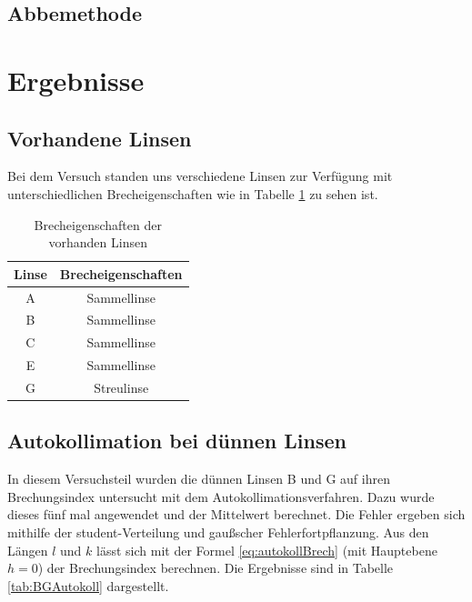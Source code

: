 \documentclass[11pt, a4paper]{article}
\begin{document}
    \subsection{Abbemethode}

    \section{Ergebnisse}
    \subsection{Vorhandene Linsen}
    Bei dem Versuch standen uns verschiedene Linsen zur Verfügung mit unterschiedlichen Brecheigenschaften wie in Tabelle \ref{tab:Brecheig} zu sehen ist.
    
    \begin{table}
        \centering
        \begin{tabular}{c|c}
            
            Linse & Brecheigenschaften \\ \hline
            A & Sammellinse \\ \hline
            B & Sammellinse \\ \hline
            C & Sammellinse \\ \hline
            E & Sammellinse \\ \hline
            G & Streulinse \\ \hline

            
        \end{tabular}
        \caption{Brecheigenschaften der vorhanden Linsen}
        \label{tab:Brecheig}
    \end{table}
    
    \subsection{Autokollimation bei dünnen Linsen}
    In diesem Versuchsteil wurden die dünnen Linsen B und G auf ihren Brechungsindex untersucht mit dem Autokollimationsverfahren.
    Dazu wurde dieses fünf mal angewendet und der Mittelwert berechnet. Die Fehler ergeben sich mithilfe der student-Verteilung und gaußscher Fehlerfortpflanzung.
    Aus den Längen $l$ und $k$ lässt sich mit der Formel \ref{eq:autokollBrech} (mit Hauptebene $h=0$) der Brechungsindex berechnen. Die Ergebnisse sind in Tabelle \ref{tab:BGAutokoll} dargestellt.
\end{document}
